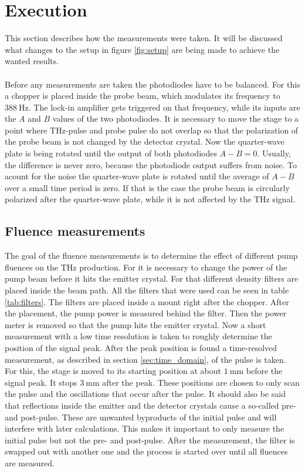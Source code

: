 \section{Execution}
\label{sec:execution}
This section describes how the measurements were taken. 
It will be discussed what changes to the setup in figure \ref{fig:setup} are being made to achieve the wanted results.
\\\\
Before any measurements are taken the photodiodes have to be balanced.
For this a chopper is placed inside the probe beam, which modulates its frequency to $\SI{388}{\hertz}$.
The lock-in amplifier gets triggered on that frequency, while its inputs are the $A$ and $B$ values of the two photodiodes.
It is necessary to move the stage to a point where $\si{\tera\hertz}$-pulse and probe pulse do not overlap so that the polarization of the probe beam is not changed by the detector crystal.
Now the quarter-wave plate is being rotated until the output of both photodiodes $A-B = 0$.
Usually, the difference is never zero, because the photodiode output suffers from noise.
To acount for the noise the quarter-wave plate is rotated until the average of $A-B$ over a small time period is zero.
If that is the case the probe beam is circularly polarized after the quarter-wave plate, while it is not affected by the $\si{\tera\hertz}$ signal.
\subsection{Fluence measurements}
The goal of the fluence measurements is to determine the effect of different pump fluences on the $\si{\tera\hertz}$ production.
For it is necessary to change the power of the pump beam before it hits the emitter crystal.
For that different density filters are placed inside the beam path.
All the filters that were used can be seen in table \ref{tab:filters}.
The filters are placed inside a mount right after the chopper.
After the placement, the pump power is measured behind the filter.
Then the power meter is removed so that the pump hits the emitter crystal.
Now a short measurement with a low time resolution is taken to roughly determine the position of the signal peak.
After the peak position is found a time-resolved measurement, as described in section \ref{sec:time_domain}, of the pulse is taken.
For this, the stage is moved to its starting position at about $\SI{1}{\milli\meter}$ before the signal peak.
It stops $\SI{3}{\milli\meter}$ after the peak.
These positions are chosen to only scan the pulse and the oscillations that occur after the pulse.
It should also be said that reflections inside the emitter and the detector crystals cause a so-called pre- and post-pulse.
These are unwanted byproducts of the initial pulse and will interfere with later calculations.
This makes it important to only measure the initial pulse but not the pre- and post-pulse.
After the measurement, the filter is swapped out with another one and the process is started over until all fluences are measured.

